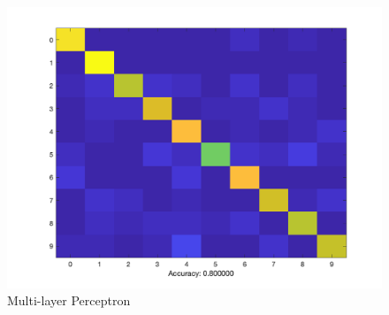 \documentclass[letter, 11pt]{article}
\begin{document}
\begin{figure}[H]
        \includegraphics[width=1.1\textwidth]{HW4/RESULT/SLPLINEAR_CONFUSION.png}
    \endminipage\hfill
    \caption{Multi-layer Perceptron}
\end{figure}
\end{document}
